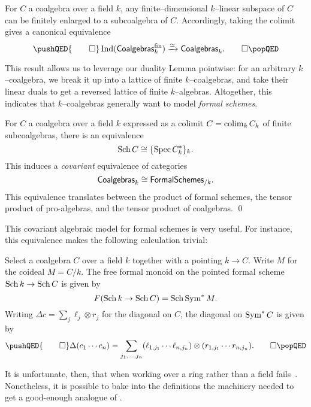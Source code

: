 \begin{lemma}\label{kCoalgebrasAreIndFinite}
For $C$ a coalgebra over a field $k$, any finite--dimensional $k$--linear subspace of $C$ can be finitely enlarged to a subcoalgebra of $C$.  Accordingly, taking the colimit gives a canonical equivalence
\[\pushQED{\qed}
\Ind(\CatOf{Coalgebras}_k^{\mathrm{fin}}) \xrightarrow{\simeq} \CatOf{Coalgebras}_k. \qedhere
\popQED\]
\end{lemma}

\noindent This result allows us to leverage our duality Lemma pointwise: for an arbitrary $k$--coalgebra, we break it up into a lattice of finite $k$--coalgebras, and take their linear duals to get a reversed lattice of finite $k$--algebras.  Altogether, this indicates that $k$--coalgebras generally want to model \emph{formal schemes}.

\begin{corollary}\label{CoalgsAndFSchsAgreeOverk}
For $C$ a coalgebra over a field $k$ expressed as a colimit $C = \operatorname*{colim}_k C_k$ of finite subcoalgebras, there is an equivalence \[\operatorname{Sch} C \cong \{\operatorname{Spec} C_k^*\}_k.\]  This induces a \emph{covariant} equivalence of categories \[\mathsf{Coalgebras}_k \cong \mathsf{FormalSchemes}_{/k}.\]  This equivalence translates between the product of formal schemes, the tensor product of pro-algebras, and the tensor product of coalgebras. \qed
\end{corollary}

This covariant algebraic model for formal schemes is very useful.  For instance, this equivalence makes the following calculation trivial:
\begin{lemma}
Select a coalgebra $C$ over a field $k$ together with a pointing $k \to C$.  Write $M$ for the coideal $M = C / k$.  The free formal monoid on the pointed formal scheme $\operatorname{Sch} k \to \operatorname{Sch} C$ is given by \[F(\operatorname{Sch} k \to \operatorname{Sch} C) = \operatorname{Sch} \operatorname{Sym}^* M.\]  Writing $\Delta c = \sum_j \ell_j \otimes r_j$ for the diagonal on $C$, the diagonal on $\operatorname{Sym}^* C$ is given by
\[\pushQED{\qed}
\Delta(c_1 \cdots c_n) = \sum_{j_1, \ldots, j_n} (\ell_{1,j_1} \cdots \ell_{n, j_n}) \otimes (r_{1, j_1} \cdots r_{n, j_n}). \qedhere
\popQED\]
\end{lemma}

It is unfortunate, then, that when working over a ring rather than a field  fails~\cite[Appendix 5.3]{Michaelis}.  Nonetheless, it is possible to bake into the definitions the machinery needed to get a good-enough analogue of .

